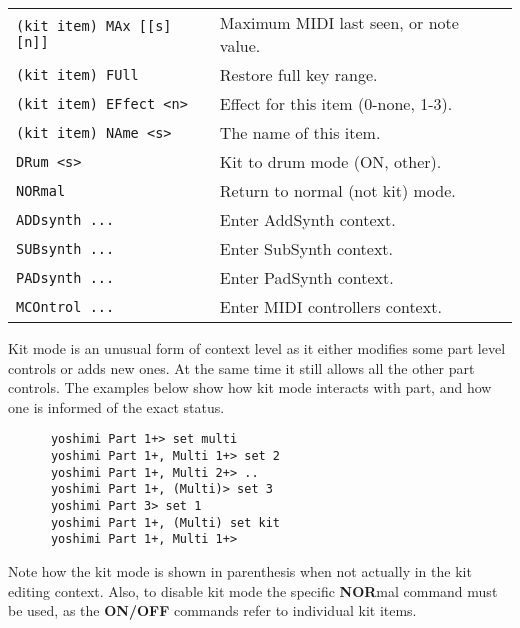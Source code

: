 \begin{center}
\begin{longtable}[l]{ ll}
   \texttt{(kit item) MAx [[s][n]]} &
      Maximum MIDI last seen, or note value.   \\
   \texttt{(kit item) FUll} &
      Restore full key range.   \\
   \texttt{(kit item) EFfect <n>} &
      Effect for this item (0-none, 1-3). \\
   \texttt{(kit item) NAme <s>} &
      The name of this item. \\
    \texttt{DRum <s>} &
      Kit to drum mode (ON, {other}). \\
    \texttt{NORmal} &
      Return to normal (not kit) mode. \\
\texttt{ADDsynth ...} &
   Enter AddSynth context. \\
\texttt{SUBsynth ...} &
   Enter SubSynth context. \\
\texttt{PADsynth ...} &
   Enter PadSynth context. \\
\texttt{MCOntrol ...} &
   Enter MIDI controllers context. \\
\end{longtable}
\end{center}

   Kit mode is an unusual form of context level as it either modifies some
   part level controls or adds new ones. At the same time it still allows all
   the other part controls. The examples below show how kit mode interacts
   with part, and how one is informed of the exact status.

   \begin{verbatim}
      yoshimi Part 1+> set multi
      yoshimi Part 1+, Multi 1+> set 2
      yoshimi Part 1+, Multi 2+> ..
      yoshimi Part 1+, (Multi)> set 3
      yoshimi Part 3> set 1
      yoshimi Part 1+, (Multi) set kit
      yoshimi Part 1+, Multi 1+>
   \end{verbatim}

   Note how the kit mode is shown in parenthesis when not actually in the kit
   editing context. Also, to disable kit mode the specific \textbf{NOR}mal
   command must be used, as the \textbf{ON/OFF} commands refer to individual
   kit items.

